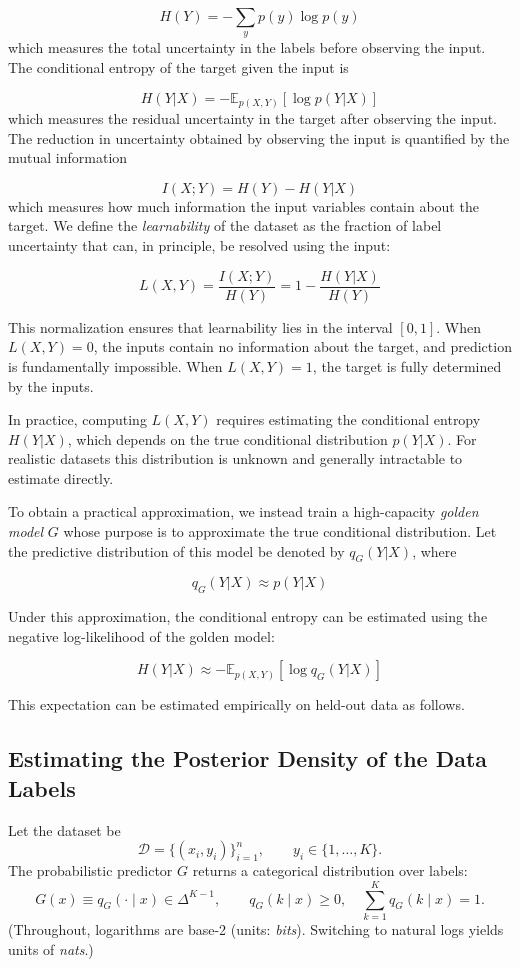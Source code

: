 \documentclass{article}
\begin{document}
\[
H(Y) = - \sum_{y} p(y)\log p(y)
\]
which measures the total uncertainty in the labels before observing the input.
The conditional entropy of the target given the input is

\[
H(Y|X) = - \mathbb{E}_{p(X,Y)}[\log p(Y|X)]
\]
which measures the residual uncertainty in the target after observing the input.
The reduction in uncertainty obtained by observing the input is quantified by the mutual information

\[
I(X;Y) = H(Y) - H(Y|X)
\]
which measures how much information the input variables contain about the target.
We define the \textit{learnability} of the dataset as the fraction of label uncertainty that can, in principle, be resolved using the input:

\[
L(X,Y) = \frac{I(X;Y)}{H(Y)} = 1 - \frac{H(Y|X)}{H(Y)}
\]

This normalization ensures that learnability lies in the interval $[0,1]$. When $L(X,Y)=0$, the inputs contain no information about the target, and prediction is fundamentally impossible. When $L(X,Y)=1$, the target is fully determined by the inputs.

In practice, computing $L(X,Y)$ requires estimating the conditional entropy $H(Y|X)$, which depends on the true conditional distribution $p(Y|X)$. For realistic datasets this distribution is unknown and generally intractable to estimate directly.

To obtain a practical approximation, we instead train a high-capacity \textit{golden model} $G$ whose purpose is to approximate the true conditional distribution. Let the predictive distribution of this model be denoted by $q_G(Y|X)$, where

\[
q_G(Y|X) \approx p(Y|X)
\]

Under this approximation, the conditional entropy can be estimated using the negative log-likelihood of the golden model:

\[
H(Y|X) \approx - \mathbb{E}_{p(X,Y)}[\log q_G(Y|X)]
\]

This expectation can be estimated empirically on held-out data as follows.

\subsection{Estimating the Posterior Density of the Data Labels}
Let the dataset be
\[
\mathcal{D}=\{(x_i,y_i)\}_{i=1}^{n},
\qquad y_i \in \{1,\dots,K\}.
\]
The probabilistic predictor $G$ returns a categorical distribution over labels:
\[
G(x) \equiv q_G(\cdot \mid x)\in\Delta^{K-1}, \qquad
q_G(k\mid x)\ge 0,\quad \sum_{k=1}^K q_G(k\mid x)=1.
\]
(Throughout, logarithms are base-2 (units: \emph{bits}). Switching to natural logs yields units of \emph{nats}.)
\end{document}
